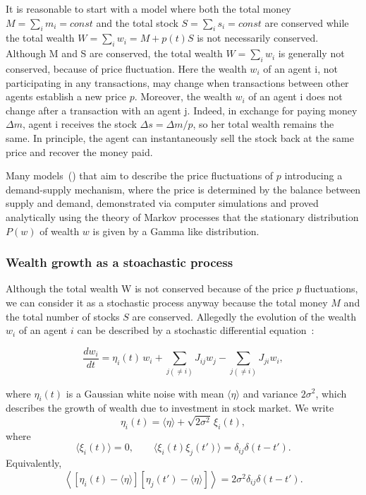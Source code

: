 It is reasonable to start with a model where both the
total money $M= \sum_i m_i = const$ and the total stock $S= \sum_i s_i = const$
are conserved while the total wealth $W= \sum_i w_i = M + p(t)  S$ is not necessarily conserved.
Although M and S are conserved, the total wealth $W= \sum_i w_i$
is generally not conserved, because of price fluctuation.
Here the wealth $w_i$ of an agent i, not participating in any transactions, may
change when transactions between other agents establish
a new price $p$. 
Moreover, the wealth $w_i$ of an agent i does
not change after a transaction with an agent j. Indeed,
in exchange for paying money $\Delta m$, agent i receives the
stock $\Delta s = \Delta m/p$, so her total wealth remains the
same. In principle, the agent can instantaneously sell the
stock back at the same price and recover the money paid.

Many models~(\cite{silver2002statistical, lux2005emergent, chatterjee2006kinetic})
that aim to describe the price fluctuations of $p$ 
introducing a demand-supply mechanism, where the price is determined by the balance between supply and demand,
demonstrated via computer simulations and proved analytically
using the theory of Markov processes that the stationary
distribution $P(w)$ of wealth $w$ is given by
a Gamma like distribution. 

\subsubsection{Wealth growth as a stoachastic process}
\label{sec:wealth-growth}

Although the total wealth W is not conserved because of the price $p$ fluctuations,
we can consider it as a stochastic process anyway because 
the total money $M$ and the total number of stocks $S$ are conserved.
Allegedly the evolution of the wealth $w_i$ of an agent $i$ can be described by a stochastic differential equation~\cite{huang2002stochastic}:

\begin{equation}
\label{eq:wealth-growth}
  \frac{dw_i}{dt} = \eta_i(t)\, w_i + \sum_{j(\neq i)} J_{ij} w_j - \sum_{j(\neq i)} J_{ji} w_i,
\end{equation}

where $\eta_i(t)$ is a Gaussian white noise with mean $\langle \eta \rangle$ and variance $2\sigma^2$, 
which describes the growth of wealth due to investment in stock market. 
We write
\begin{equation}
\eta_i(t)=\langle\eta\rangle+\sqrt{2\sigma^2}\,\xi_i(t),
\end{equation}
where
\begin{equation}
\langle\xi_i(t)\rangle=0,
\qquad
\langle\xi_i(t)\xi_j(t')\rangle
=\delta_{ij}\delta(t-t').
\end{equation}
Equivalently,
\begin{equation}
\left\langle
[\eta_i(t)-\langle\eta\rangle]
[\eta_j(t')-\langle\eta\rangle]
\right\rangle
=2\sigma^2\delta_{ij}\delta(t-t').
\end{equation}

